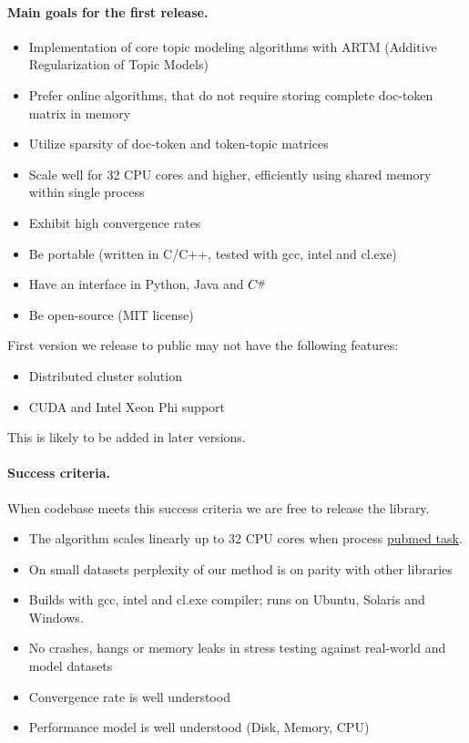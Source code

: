 \documentclass[11pt,a4paper,twoside]{report}
\newcommand{\Csharp}{%
  {\settoheight{\dimen0}{C}C\kern-.05em \resizebox{!}{\dimen0}{\raisebox{\depth}{\#}}}}
\begin{document}
\paragraph{Main goals for the first release.}
\begin{itemize}
    \item Implementation of core topic modeling algorithms with ARTM (Additive Regularization of Topic Models)
    \item Prefer online algorithms, that do not require storing complete doc-token matrix in memory
    \item Utilize sparsity of doc-token and token-topic matrices
    \item Scale well for 32 CPU cores and higher, efficiently using shared memory within single process
    \item Exhibit high convergence rates
    \item Be portable (written in C/C++, tested with gcc, intel and cl.exe)
    \item Have an interface in Python, Java and $\Csharp$
    \item Be open-source (MIT license)
\end{itemize}
First version we release to public may not have the following features:
\begin{itemize}
    \item Distributed cluster solution
    \item CUDA and Intel Xeon Phi support
\end{itemize}
This is likely to be added in later versions.

\paragraph{Success criteria.}
When codebase meets this success criteria we are free to release the library.
\begin{itemize}
    \item The algorithm scales linearly up to 32 CPU cores when process
    \href{http://archive.ics.uci.edu/ml/datasets/Bag+of+Words}{pubmed task}.
    \item On small datasets perplexity of our method is on parity with other libraries
    \item Builds with gcc, intel and cl.exe compiler; runs on Ubuntu, Solaris and Windows.
    \item No crashes, hangs or memory leaks in stress testing against real-world and model datasets
    \item Convergence rate is well understood
    \item Performance model is well understood (Disk, Memory, CPU)
\end{itemize}
\end{document}
